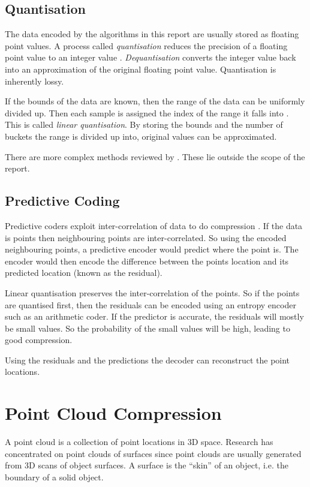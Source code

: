 \documentclass[a4paper]{report}
\begin{document}
\subsection{Quantisation}

The data encoded by the algorithms in this report are usually stored as
floating point values. A process called \emph{quantisation} reduces the
precision of a floating point value to an integer value
\citep{ag-racm-03}. \emph{Dequantisation} converts the integer value back into
an approximation of the original floating point value. Quantisation is
inherently lossy.

If the bounds of the data are known, then the range of the data can be
uniformly divided up. Then each sample is assigned the index of the range it
falls into \citep{drozdek}. This is called \emph{linear quantisation}. By
storing the bounds and the number of buckets the range is divided up into,
original values can be approximated.

There are more complex methods reviewed by \citep{ag-racm-03}. These lie
outside the scope of the report.


\subsection{Predictive Coding}

Predictive coders exploit inter-correlation of data to do compression
\citep{drozdek}. If the data is points then neighbouring points are
inter-correlated. So using the encoded neighbouring points, a predictive
encoder would predict where the point is. The encoder would then encode the
difference between the points location and its predicted location (known as
the residual).

Linear quantisation preserves the inter-correlation of the points. So if the
points are quantised first, then the residuals can be encoded using an entropy
encoder such as an arithmetic coder. If the predictor is accurate, the
residuals will mostly be small values. So the probability of the small values
will be high, leading to good compression.

Using the residuals and the predictions the decoder can reconstruct the point
locations.


\section{Point Cloud Compression}

A point cloud is a collection of point locations in 3D space. Research has
concentrated on point clouds of surfaces since point clouds are usually
generated from 3D scans of object surfaces. A surface is the ``skin'' of an
object, i.e. the boundary of a solid object.
\end{document}
